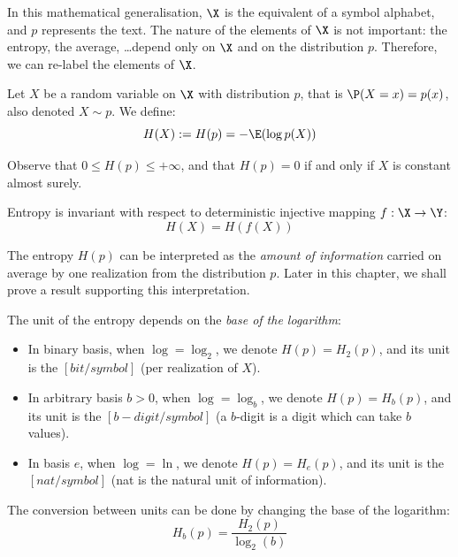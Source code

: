 \documentclass[toc, titlepaged]{../cs-classes/cs-classes}
\begin{document}
\begin{remark}
    In this mathematical generalisation, $\X$ is the equivalent of a symbol alphabet, and $p$ represents the text. The nature of the elements of $\X$ is not important: the entropy, the average, \dots depend only on $\X$ and on the distribution $p$. Therefore, we can re-label the elements of $\X$.
\end{remark}

\begin{definition}
    Let $X$ be a random variable on $\X$ with distribution $p$, that is $\P(X=x) = p(x)$, also denoted $X \sim p$. We define:
    \begin{equation}
        H(X) := H(p) = -\E(\log p(X))
    \end{equation}
\end{definition}

Observe that $0\leq H(p) \leq +\infty$, and that $H(p)=0$ if and only if $X$ is constant almost surely.

\begin{property}
    Entropy is invariant with respect to deterministic injective mapping $f: \X \to \Y$:
    \begin{equation*}
        H(X) = H(f(X))
    \end{equation*}
\end{property}

The entropy $H(p)$ can be interpreted as the \emph{amount of information} carried on average by one realization from the distribution $p$. Later in this chapter, we shall prove a result supporting this interpretation. 

\begin{definition} The unit of the entropy depends on the \emph{base of the logarithm}:
    \begin{itemize}
        \item In binary basis, when $\log = \log_2$, we denote $H(p)=H_2(p)$, and its unit is the $[bit/symbol]$ (per realization of $X$).
        \item In arbitrary basis $b>0$, when $\log = \log_b$, we denote $H(p)=H_b(p)$, and its unit is the $[b-digit/symbol]$ (a $b$-digit is a digit which can take $b$ values).
        \item In basis $e$, when $\log = \ln$, we denote $H(p)=H_e(p)$, and its unit is the $[nat/symbol]$ (nat is the natural unit of information).
    \end{itemize}
    
    The conversion between units can be done by changing the base of the logarithm:
    \begin{equation*}
        H_b(p) = \frac{H_2(p)}{\log_2(b)}
    \end{equation*}
\end{definition}
\end{document}
